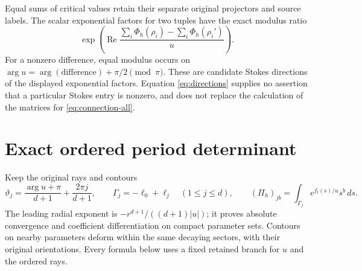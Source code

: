 Equal sums of critical values retain their separate original projectors
and source labels.  The scalar exponential factors for two tuples have
the exact modulus ratio
\begin{equation}
 \exp\!\left(\operatorname{Re}
      \frac{\sum_i\Phi_h(\rho_i)-\sum_i\Phi_h(\rho_i')}{u}\right).
 \label{eq:directions}
\end{equation}
For a nonzero difference, equal modulus occurs on
$\arg u=\arg(\text{difference})+\pi/2\pmod\pi$.
These are candidate Stokes directions of the displayed exponential
factors.  Equation \eqref{eq:directions} supplies no assertion that a
particular Stokes entry is nonzero, and does not replace the calculation
of the matrices for \eqref{eq:connection-all}.

\section{Exact ordered period determinant}

Keep the original rays and contours
\begin{equation}
 \vartheta_j=\frac{\arg u+\pi}{d+1}+\frac{2\pi j}{d+1},
 \qquad \Gamma_j=-\ell_0+\ell_j\quad(1\le j\le d),
 \qquad
 (\Pi_h)_{jb}=\int_{\Gamma_j}e^{f_t(s)/u}s^b\,ds.
 \label{eq:period}
\end{equation}
The leading radial exponent is
$-r^{d+1}/((d+1)|u|)$; it proves absolute convergence and
coefficient differentiation on compact parameter sets.  Contours on
nearby parameters deform within the same decaying sectors, with their
original orientations.  Every formula below uses a fixed retained
branch for $u$ and the ordered rays.

